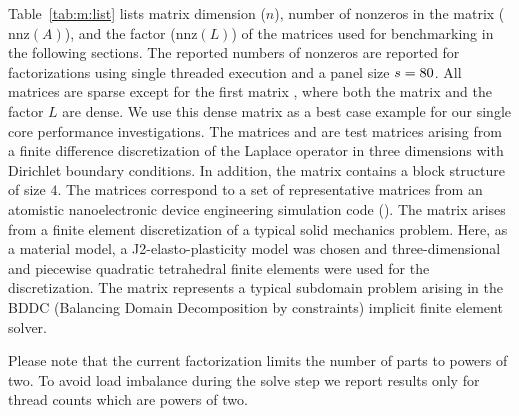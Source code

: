 Table~\ref{tab:m:list} lists matrix dimension ($n$), number of nonzeros in the
matrix ($\text{nnz}(A)$), and the factor (nnz$(L)$) of the matrices used for
benchmarking in the following sections.
The reported numbers of nonzeros
are reported for factorizations using single threaded execution
and a panel size $s = 80$.
All matrices are sparse except
for the first matrix , where both the matrix and
the factor $L$ are dense.
We use this dense matrix as a best case example for our single core performance
investigations.
The matrices  and  are test matrices arising from a
finite difference discretization of the Laplace operator in three dimensions
with Dirichlet boundary conditions.
In addition, the matrix  contains a block structure
of size $4$.
The  matrices correspond to a set of representative matrices from
an atomistic nanoelectronic device engineering simulation code (\cite{luisier2011atomistic}).
The matrix  arises from a finite element discretization of a typical
solid mechanics problem. Here, as a material model, a J2-elasto-plasticity model
was chosen and three-dimensional and piecewise quadratic tetrahedral finite
elements were used for the discretization. The matrix  represents a
typical subdomain problem arising in the BDDC (Balancing Domain Decomposition by
constraints) implicit finite element solver.

Please note that the current factorization limits the number of parts to powers
of two.
To avoid load imbalance during the solve step we report results only for thread
counts which are powers of two.

